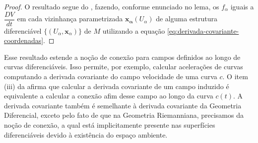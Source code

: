 \begin{proposition}
\begin{proof}
		O resultado segue do , fazendo, conforme enunciado no lema, os $f_{\alpha}$ iguais a $\dfrac{DV}{dt}$ em cada vizinhança parametrizada $\mathbf{x_{\alpha}}(U_{\alpha})$ de alguma estrutura diferenciável $\{ (U_{\alpha},\mathbf{x}_{\alpha}) \}$ de $M$ utilizando a equação \eqref{eq:derivada-covariante-coordenadas}.
	\end{proof}
\end{proposition}
Esse resultado estende a noção de conexão para campos definidos ao longo de curvas diferenciáveis. Isso permite, por exemplo, calcular acelerações de curvas computando a derivada covariante do campo velocidade de uma curva $c$.
O item (iii) da  afirma que calcular a derivada covariante de um campo induzido é equivalente a calcular a conexão afim desse campo ao longo da curva $c(t)$. A derivada covariante também é semelhante à derivada covariante da Geometria Diferencial, exceto pelo fato de que na Geometria Riemanniana, precisamos da noção de conexão, a qual está implicitamente presente nas superfícies diferenciáveis devido à existência do espaço ambiente.

